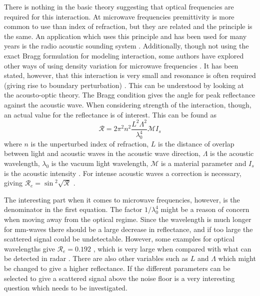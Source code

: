\documentclass[10pt,a4paper,draft]{scrartcl}
\begin{document}
	There is nothing in the basic theory suggesting that optical frequencies are required for this interaction. At microwave frequencies premittivity is more common to use than index of refraction, but they are related and the principle is the same. An application which uses this principle and has been used for many years is the radio acoustic sounding system \cite{Buerkle2007}. Additionally, though not using the exact Bragg formulation for modeling interaction, some authors have explored other ways of using density variation for microwave frequencies \cite{Lawrence2001}\cite{Merkel2006}. It has been stated, however, that this interaction is very small and resonance is often required (giving rise to boundary perturbation) \cite{Buerkle2007}. This can be understood by looking at the acousto-optic theory. The Bragg condition gives the angle for peak reflectance against the acoustic wave. When considering strength of the interaction, though, an actual value for the reflectance is of interest. This can be found as
	\begin{equation*}
		\mathcal{R} = 2\pi^2n^2 \frac{L^2 \Lambda^2}{\lambda_0^4} \mathcal{M}I_s
	\end{equation*}
	where $n$ is the unperturbed index of refraction, $L$ is the distance of overlap between light and acoustic waves in the acoustic wave direction, $\Lambda$ is the acoustic wavelength, $\lambda_0$ is the vacuum light wavelength, $\mathcal{M}$ is a material parameter and $I_s$ is the acoustic intensity \cite{Saleh2007}. For intense acoustic waves a correction is necessary, giving $\mathcal{R}_e = \sin{^2\sqrt{\mathcal{R}}}$ \cite{Saleh2007}.
	
	The interesting part when it comes to microwave frequencies, however, is the denominator in the first equation. The factor $1/\lambda_0^4$ might be a reason of concern when moving away from the optical regime. Since the wavelength is much longer for mm-waves there should be a large decrease in reflectance, and if too large the scattered signal could be undetectable. However, some examples for optical wavelengths give $\mathcal{R}_e = 0.192$ \cite{Saleh2007}, which is very large when compared with what can be detected in radar . There are also other variables such as $L$ and $\Lambda$ which might be changed to give a higher reflectance. If the different parameters can be selected to give a scattered signal above the noise floor is a very interesting question which needs to be investigated.
	
\end{document}
